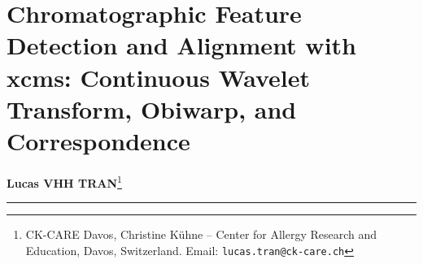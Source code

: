 \documentclass[11pt,twoside,openright]{book}
\begin{document}
\setcounter{chapter}{7} %
\chapter{Chromatographic Feature Detection and Alignment with xcms: Continuous Wavelet Transform, Obiwarp, and Correspondence}
\label{ch:detect_features}

\noindent
\textbf{Lucas VHH TRAN}\footnote{CK-CARE Davos, Christine K\"uhne -- Center for Allergy Research and Education, Davos, Switzerland. Email: \texttt{lucas.tran@ck-care.ch}}\\
\rule{\textwidth}{0.8pt}

\begin{abstract}
\noindent
Untargeted high-resolution liquid chromatography--mass spectrometry (LC-MS) datasets in metabolomics, lipidomics, and bottom-up proteomics do not directly yield molecular abundance tables. The primary output of an instrument acquisition is a continuous, noisy three-dimensional data surface spanned by retention time ($t_R$), mass-to-charge ratio ($m/z$), and detector intensity ($I$). Converting raw instrument files into a reproducible, quantitative feature matrix requires rigorous chromatographic peak detection, retention time alignment across runs, correspondence grouping, and iterative gap-filling.

This chapter establishes the analytical chemistry, signal processing, and practical foundations of untargeted LC-MS feature extraction using the modern \texttt{xcms} platform and the Bioconductor \texttt{MSnbase} infrastructure. We formalize the distinction between raw mass spectral peaks and chromatographic features, establish the continuous wavelet transform (CWT) framework and Mexican hat (Ricker) wavelet mechanics for chromatographic apex localization, and formulate the dynamic region-of-interest (ROI) mass-tracking algorithm. We then examine retention time drift, contrasting non-linear dynamic time warping via Ordered Bijective Interpolated Warping (\texttt{obiwarp}) against peak-density LOESS regression. Furthermore, we formalize correspondence grouping via kernel density estimation and formulate the targeted re-integration mechanics of gap-filling (\texttt{fillChromPeaks}) to prevent the fabrication of artificial missing values. The chapter includes a complete, reproducible R laboratory on benchmark datasets, an analysis of the ``Five Deadly Sins'' of feature extraction, a tutor's self-assessment diagnostic checklist, and multi-tier exercises with complete worked solutions.
\end{abstract}
\end{document}
